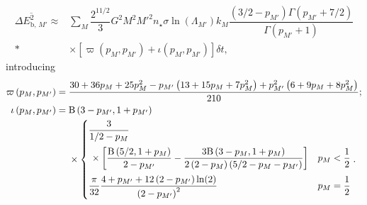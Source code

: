 \begin{align}
\overline{\Delta E^2_{\mathrm{b},\,M'}} \approx {} & \sum_M\dfrac{2^{11/2}}{3}G^2M^2{M'}^2n_\star\sigma\ln\left(\Lambda_{M'}\right) k_M \dfrac{(3/2 - p_{M'})\Gamma(p_{M'} + 7/2)}{\Gamma(p_{M'} + 1)} \nonumber \\*
 {} & \times \left[ \varpi\left(p_M,p_{M'}\right) + \iota \left(p_M,p_{M'}\right) \right] \delta t,
\end{align}
introducing
\begin{align}
\varpi\left(p_M,p_{M'}\right) = {} & \dfrac{30 + 36p_M + 25p_M^2 - p_{M'}\left(13 + 15p_M + 7 p_M^2\right) + p_{M'}^2\left(6 + 9p_M + 8p_M^2\right)}{210}; \\
\iota\left(p_M,p_{M'}\right) = {} & \Beta\left(3-p_{M'},1+p_{M'}\right) \nonumber \\*
 {} & {} \times \begin{cases} \dfrac{3}{1/2 - p_M} \vspace{2mm} \\
  \, {} \times \left[\dfrac{\Beta\left(5/2,1+p_M\right)}{2-p_{M'}} - \dfrac{3\Beta\left(3-p_M,1+p_M\right)}{2\left(2-p_M\right)\left(5/2 - p_M - p_{M'}\right)}\right] \vspace{2mm} & p_M < \recip{2} \\
\dfrac{\pi}{32}\dfrac{4 + p_{M'} + 12 \left(2 - p_{M'}\right) \ln(2)}{\left(2-p_{M'}\right)^2} & p_M = \recip{2} \end{cases}.
\end{align}

